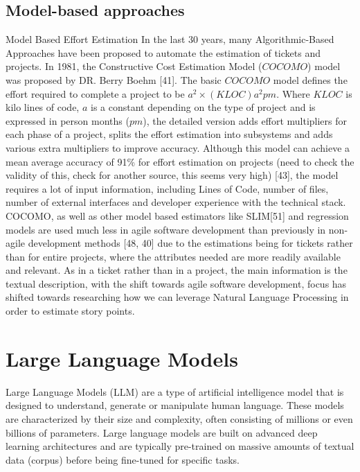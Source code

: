 \documentclass{UoYCSproject}
\begin{document}
\subsection{Model-based approaches}
\label{subsec:model-based-approaches}
Model Based Effort Estimation
In the last 30 years, many Algorithmic-Based Approaches have been proposed to automate the estimation of tickets
and projects.
In 1981, the Constructive Cost Estimation Model ($COCOMO$) model was proposed by DR. Berry Boehm [41].
The basic $COCOMO$ model defines the effort required to complete a project to be $a^2 \times (KLOC)a^2pm$.
Where $KLOC$ is kilo lines of code, $a$ is a constant depending on the type of project and is expressed in person months ($pm$), the detailed version adds effort multipliers for each phase of a project, splits the effort estimation into subsystems and adds various extra multipliers to improve accuracy.
Although this model can achieve a mean average accuracy of 91\% for effort estimation on projects (need to check the validity of this, check for another source, this seems very high) [43], the model requires a lot of input information, including Lines of Code, number of files, number of external interfaces and developer experience with the technical stack.
COCOMO, as well as other model based estimators like SLIM[51] and regression models are used much less in agile software development than previously in non-agile development methods [48, 40] due to the estimations being for tickets rather than for entire projects, where the attributes needed are more readily available and relevant.
As in a ticket rather than in a project, the main information is the textual description, with the shift towards agile software development, focus has shifted towards researching how we can leverage Natural Language Processing in order to estimate story points.

\section{Large Language Models}
\label{sec:large-language-models}
Large Language Models (LLM) are a type of artificial intelligence model that is designed to understand, generate
or manipulate human language.
These models are characterized by their size and complexity, often consisting of millions or even billions of parameters.
Large language models are built on advanced deep learning architectures and are typically pre-trained on massive
amounts of textual data (corpus) before being fine-tuned for specific tasks. \par
\end{document}
